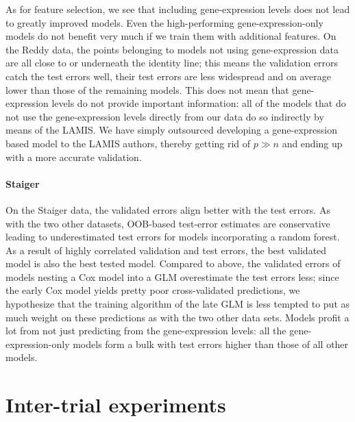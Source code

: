 As for feature selection, we see that including gene-expression levels does not lead to greatly 
improved models. Even the high-performing gene-expression-only models do not benefit very much if 
we train them with additional features. On the Reddy data, the points belonging to models not using 
gene-expression data are all close to or underneath the identity line; this means the validation 
errors 
catch the test errors well, their test errors are less widespread and on average lower than those 
of the remaining models. This does not mean that gene-expression levels do not provide important 
information: all of the models that do not use the gene-expression levels directly from our data 
do so indirectly by means of the LAMIS. We have simply outsourced developing a gene-expression based 
model to the LAMIS authors, thereby getting rid of $p \gg n$ and ending up with a more accurate 
validation.

\paragraph{Staiger}

On the Staiger data, the validated errors align better with the test errors. As with the two other 
datasets, OOB-based test-error estimates are conservative leading to underestimated test errors 
for models incorporating a random forest. As a result of highly correlated validation and test 
errors, the best validated model is also the best tested model. Compared to above, the validated errors 
of models nesting a Cox model into a GLM overestimate the test errors less; since the early Cox 
model yields pretty poor cross-validated predictions, we hypothesize that the training 
algorithm of the late GLM is less tempted to put as much weight on these predictions as with the 
two other data sets. Models profit a lot from not just predicting from the gene-expression levels: 
all the gene-expression-only models form a bulk with test errors higher than those of all other 
models. 

\section{Inter-trial experiments}\label{sec:inter-trial}

